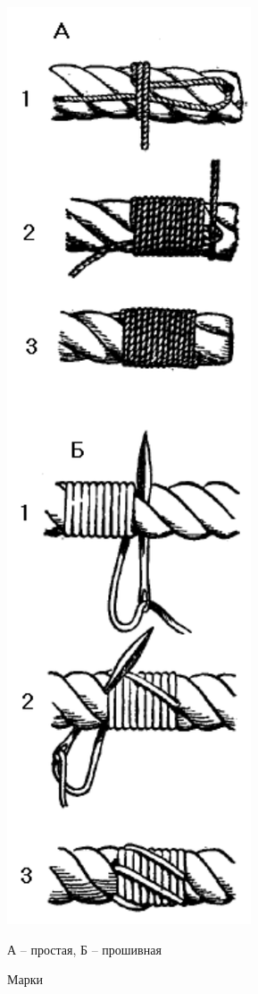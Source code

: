 \documentclass[a4paper, 12pt, twoside, final]{scrbook}
\begin{document}
\begin{figure}
   \centering
   \includegraphics{pics/56_Marki} %
   \caption{Марки}
   \label{fig:56}
   \centering\small
   А \--- простая, Б \--- прошивная
\end{figure}
\end{document}
